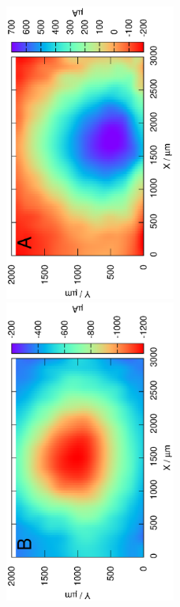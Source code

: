 \begin{figure}
\centering
\includegraphics[width=0.5\textwidth, angle=-90]{img/mérések/Fe_h500_field.eps}
\includegraphics[width=0.5\textwidth, angle=-90]{img/mérések/Zn_h500_field.eps}

\end{figure}
